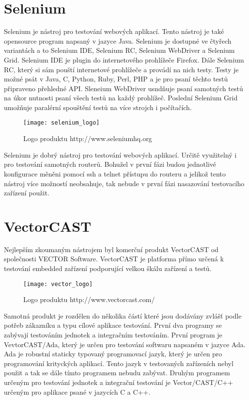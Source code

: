 \section{Selenium}
Selenium je nástroj pro testování webových aplikací. Tento nástroj je také opensource program napsaný v jazyce Java. Selenium je dostupné ve čtyřech variantách a to Selenium IDE, Selenium RC, Selenium WebDriver a Selenium Grid. Selenium IDE je plugin do internetového prohlížeče Firefox. Dále Selenium RC, který si sám pouští internetové prohlížeče a provádí na nich testy. Testy je možné psát v Java, C, Python, Ruby, Perl, PHP a je pro psaní těchto testů připraveno přehledné API. Sleneium WebDriver usndňuje psaní samotných testů na úkor nutnosti psaní všech testů na každý prohlížeč. Poslední Selenium Grid umožňuje paralérní spouštění testů na více strojch i počítačích.

\begin{figure}[h]
  \centering
  \texttt{[image: selenium\_logo]}
  \caption{Logo produktu http://www.seleniumhq.org}
  \label{fig:selenium_logo}
\end{figure}

Selenium je dobrý nástroj pro testování webových aplikací. Určitě využitelný i pro testování samotných routerů. Bohužel v první fázi budou jednotlivé konfigurace měněni pomocí ssh a telnet přístupu do routeru a jelikož tento nástroj více možností neobsahuje, tak nebude v první fázi nasazování testovacího zařízení použit.

\section{VectorCAST}
Nejlepším zkoumaným nástrojem byl komerční produkt VectorCAST od společnosti VECTOR Software. VectorCAST je platforma přímo určená k testování embedded zařízení podporující velkou škálu zařízení a testů.

\begin{figure}[h]
  \centering
  \texttt{[image: vector\_logo]}
  \caption{Logo produktu http://www.vectorcast.com/}
  \label{fig:vector_logo}
\end{figure}

Samotná produkt je rozdělen do několika částí které jsou dodávány zvlášť podle potřeb zákazníku a typu cílové aplikace testování. První dva programy se zabývají testováním jednotek a integračním testováním. První program je VevtorCAST/Ada, který je určen pro testování softwaru napsaném v jazyce Ada. Ada je robustní staticky typovaný programovací jazyk, který je určen pro programování krityckých aplikací. Tento jazyk v testovaných zařízeních nebyl použit a tak se dále tímto programem nebudu zabývat. Druhým programem určeným pro testování jednotek a integrační testování je Vector/CAST/C++ určeným pro aplikace psané v jazycích C a C++.

